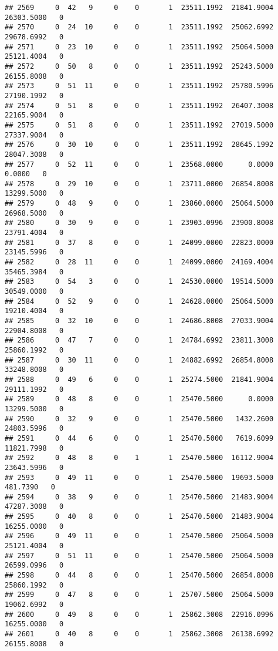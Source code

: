 \documentclass[
]{article}
\begin{document}
\begin{enumerate}
\begin{verbatim}
## 2569     0  42   9     0    0       1  23511.1992  21841.9004  26303.5000   0
## 2570     0  24  10     0    0       1  23511.1992  25062.6992  29678.6992   0
## 2571     0  23  10     0    0       1  23511.1992  25064.5000  25121.4004   0
## 2572     0  50   8     0    0       1  23511.1992  25243.5000  26155.8008   0
## 2573     0  51  11     0    0       1  23511.1992  25780.5996  27190.1992   0
## 2574     0  51   8     0    0       1  23511.1992  26407.3008  22165.9004   0
## 2575     0  51   8     0    0       1  23511.1992  27019.5000  27337.9004   0
## 2576     0  30  10     0    0       1  23511.1992  28645.1992  28047.3008   0
## 2577     0  52  11     0    0       1  23568.0000      0.0000      0.0000   0
## 2578     0  29  10     0    0       1  23711.0000  26854.8008  13299.5000   0
## 2579     0  48   9     0    0       1  23860.0000  25064.5000  26968.5000   0
## 2580     0  30   9     0    0       1  23903.0996  23900.8008  23791.4004   0
## 2581     0  37   8     0    0       1  24099.0000  22823.0000  23145.5996   0
## 2582     0  28  11     0    0       1  24099.0000  24169.4004  35465.3984   0
## 2583     0  54   3     0    0       1  24530.0000  19514.5000  30549.0000   0
## 2584     0  52   9     0    0       1  24628.0000  25064.5000  19210.4004   0
## 2585     0  32  10     0    0       1  24686.8008  27033.9004  22904.8008   0
## 2586     0  47   7     0    0       1  24784.6992  23811.3008  25860.1992   0
## 2587     0  30  11     0    0       1  24882.6992  26854.8008  33248.8008   0
## 2588     0  49   6     0    0       1  25274.5000  21841.9004  29111.1992   0
## 2589     0  48   8     0    0       1  25470.5000      0.0000  13299.5000   0
## 2590     0  32   9     0    0       1  25470.5000   1432.2600  24803.5996   0
## 2591     0  44   6     0    0       1  25470.5000   7619.6099  11821.7998   0
## 2592     0  48   8     0    1       1  25470.5000  16112.9004  23643.5996   0
## 2593     0  49  11     0    0       1  25470.5000  19693.5000    481.7390   0
## 2594     0  38   9     0    0       1  25470.5000  21483.9004  47287.3008   0
## 2595     0  40   8     0    0       1  25470.5000  21483.9004  16255.0000   0
## 2596     0  49  11     0    0       1  25470.5000  25064.5000  25121.4004   0
## 2597     0  51  11     0    0       1  25470.5000  25064.5000  26599.0996   0
## 2598     0  44   8     0    0       1  25470.5000  26854.8008  25860.1992   0
## 2599     0  47   8     0    0       1  25707.5000  25064.5000  19062.6992   0
## 2600     0  49   8     0    0       1  25862.3008  22916.0996  16255.0000   0
## 2601     0  40   8     0    0       1  25862.3008  26138.6992  26155.8008   0

\end{verbatim}
\end{enumerate}
\end{document}
